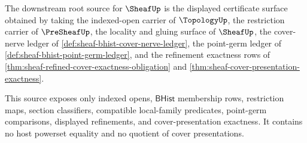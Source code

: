 \begin{definition}
\label{def:sheaf-downstream-root-source}
The downstream root source for $\SheafUp$ is the displayed certificate surface obtained by taking the indexed-open carrier of $\TopologyUp$, the restriction carrier of $\PreSheafUp$, the locality and gluing surface of $\SheafUp$, the cover-nerve ledger of \autoref{def:sheaf-bhist-cover-nerve-ledger}, the point-germ ledger of \autoref{def:sheaf-bhist-point-germ-ledger}, and the refinement exactness rows of \autoref{thm:sheaf-refined-cover-exactness-obligation} and \autoref{thm:sheaf-cover-presentation-exactness}.

This source exposes only indexed opens, $\mathsf{BHist}$ membership rows, restriction maps, section classifiers, compatible local-family predicates, point-germ comparisons, displayed refinements, and cover-presentation exactness. It contains no host powerset equality and no quotient of cover presentations.
\end{definition}


